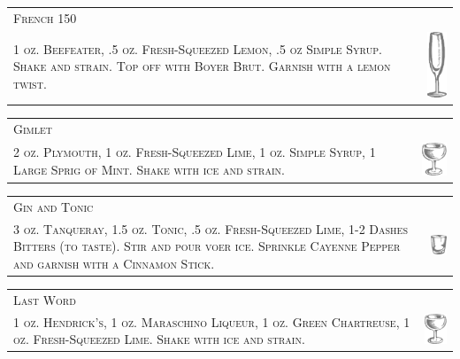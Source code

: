 \documentclass{article}
\begin{document}
\begin{tabular}{b{2.5in} m{0.625in}}
  \multicolumn{2}{p{3.5in}}{\centering\Huge\textsc{French 150}} \\ 
  \textsc{1 oz. Beefeater, .5 oz. Fresh-Squeezed Lemon, .5 oz
  Simple Syrup. Shake and strain. Top off with Boyer Brut.
  Garnish with a lemon twist.} &
  \includegraphics[width=0.5in]{flute.png}
\end{tabular}

\begin{tabular}{b{2.5in} m{0.625in}}
  \multicolumn{2}{p{3.5in}}{\centering\Huge\textsc{Gimlet}} \\ 
  \textsc{2 oz. Plymouth, 1 oz. Fresh-Squeezed Lime, 1 oz. Simple
  Syrup, 1 Large Sprig of Mint. Shake with ice and strain.} &
  \includegraphics[width=0.5in]{coupe.png}
\end{tabular}

\begin{tabular}{b{2.5in} m{0.625in}}
  \multicolumn{2}{p{3.5in}}{\centering\Huge\textsc{Gin and Tonic}} \\ 
  \textsc{3 oz. Tanqueray, 1.5 oz. Tonic, .5 oz. Fresh-Squeezed Lime, 1-2
  Dashes Bitters (to taste). Stir and pour voer ice. Sprinkle Cayenne
  Pepper and garnish with a Cinnamon Stick.} &
  \includegraphics[width=0.5in]{rocks_glass.png}
\end{tabular}

\begin{tabular}{b{2.5in} m{0.625in}}
  \multicolumn{2}{p{3.5in}}{\centering\Huge\textsc{Last Word}} \\ 
  \textsc{1 oz. Hendrick's, 1 oz. Maraschino Liqueur, 1 oz. Green
  Chartreuse, 1 oz. Fresh-Squeezed Lime. Shake with ice and strain.} &
  \includegraphics[width=0.5in]{coupe.png}
\end{tabular}
\end{document}
